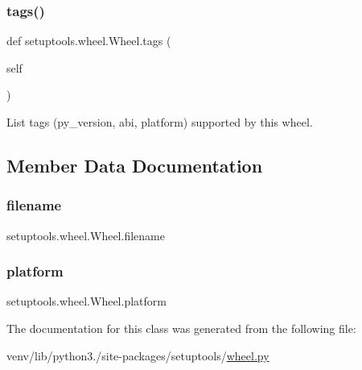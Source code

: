 \subsubsection{\texorpdfstring{tags()}{tags()}}
{\footnotesize\ttfamily def setuptools.\+wheel.\+Wheel.\+tags (\begin{DoxyParamCaption}\item[{}]{self }\end{DoxyParamCaption})}

\begin{DoxyVerb}List tags (py_version, abi, platform) supported by this wheel.\end{DoxyVerb}
 

\subsection{Member Data Documentation}
\mbox{\label{classsetuptools_1_1wheel_1_1Wheel_a922b9e7e017e547a8588c48265ee2dc3}} 
\subsubsection{\texorpdfstring{filename}{filename}}
{\footnotesize\ttfamily setuptools.\+wheel.\+Wheel.\+filename}

\mbox{\label{classsetuptools_1_1wheel_1_1Wheel_ab0c549e3d958bd72b70c3b984fe5b1fe}} 
\subsubsection{\texorpdfstring{platform}{platform}}
{\footnotesize\ttfamily setuptools.\+wheel.\+Wheel.\+platform}



The documentation for this class was generated from the following file\+:\begin{DoxyCompactItemize}
\item 
venv/lib/python3./site-\/packages/setuptools/\hyperlink{setuptools_2wheel_8py}{wheel.\+py}\end{DoxyCompactItemize}
